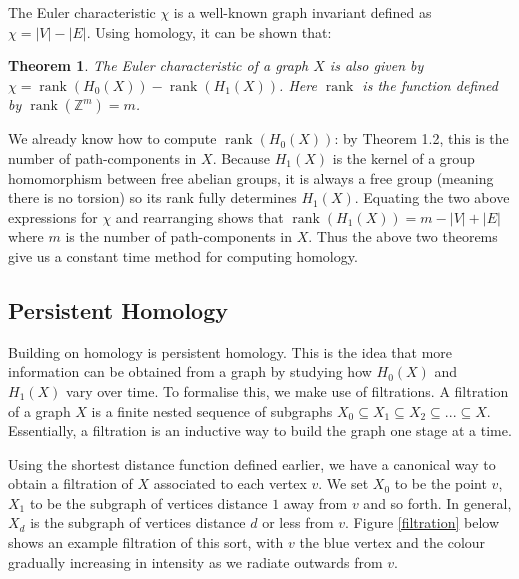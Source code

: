 \documentclass[12pt,a4paper]{amsart}
\numberwithin{equation}{section}
\def\Z{{\mathbb Z}}
\def\rank{\operatorname{rank}}
\theoremstyle{plain}
\newtheorem{Th}{Theorem}[section]
\theoremstyle{definition}
\begin{document}
The Euler characteristic $\chi$ is a well-known graph invariant defined as $\chi = |V| - |E|$. Using homology, it can be shown that:

\begin{Th}
The Euler characteristic of a graph $X$ is also given by $\chi = \rank(H_0(X)) - \rank(H_1(X))$. Here $\rank$ is the function defined by $\rank(\Z^m) = m$.
\end{Th}

We already know how to compute $\rank(H_0(X))$: by Theorem 1.2, this is the number of path-components in $X$. Because $H_1(X)$ is the kernel of a group homomorphism between free abelian groups, it is always a free group (meaning there is no torsion) so its rank fully determines $H_1(X)$. Equating the two above expressions for $\chi$ and rearranging shows that $\rank(H_1(X)) = m - |V| + |E|$ where $m$ is the number of path-components in $X$. Thus the above two theorems give us a constant time method for computing homology.

\subsection{Persistent Homology}

Building on homology is persistent homology. This is the idea that more information can be obtained from a graph by studying how $H_0(X)$ and $H_1(X)$ vary over time. To formalise this, we make use of filtrations. A filtration of a graph $X$ is a finite nested sequence of subgraphs $X_0 \subseteq X_1 \subseteq X_2 \subseteq ... \subseteq X$. Essentially, a filtration is an inductive way to build the graph one stage at a time. 

Using the shortest distance function defined earlier, we have a canonical way to obtain a filtration of $X$ associated to each vertex $v$. We set $X_0$ to be the point $v$, $X_1$ to be the subgraph of vertices distance $1$ away from $v$ and so forth. In general, $X_d$ is the subgraph of vertices distance $d$ or less from $v$. Figure \ref{filtration} below shows an example filtration of this sort, with $v$ the blue vertex and the colour gradually increasing in intensity as we radiate outwards from $v$.
\end{document}
